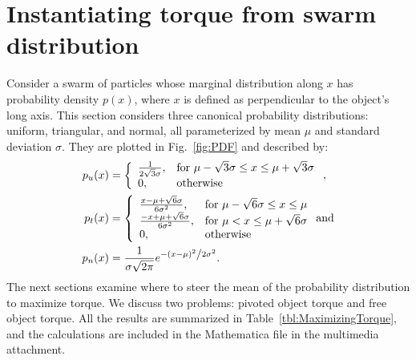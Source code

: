 \section{Instantiating torque from swarm distribution}\label{sec:torqueDist}
%
Consider a swarm of particles whose marginal distribution along $x$ has probability density $p(x)$, where $x$ is defined as perpendicular to the object's long axis.
This section considers three canonical probability distributions: uniform, triangular, and normal, all parameterized by mean $\mu$ and standard deviation $\sigma$. 
They are plotted in Fig.~\ref{fig:PDF} and described by:
%
\begin{align}
p_u(x) &=  \left\{
\begin{array}{ll}
    \frac{1}{2\sqrt{3}\sigma}, &  \textrm{for   } \mu-\sqrt{3}\sigma \leq x \leq \mu+\sqrt{3}\sigma\\
     0, & \textrm{otherwise}\\
\end{array} 
\right. ,\\
p_t(x) &=  \left\{
\begin{array}{ll}
    \frac{x-\mu + \sqrt{6} \sigma}{6\sigma^2}, &  \textrm{for   } \mu-\sqrt{6}\sigma \leq x \leq \mu\\
     \frac{-x+\mu + \sqrt{6} \sigma}{6\sigma^2}, &  \textrm{for   } \mu < x \leq \mu+ \sqrt{6}\sigma \\ 
     0, & \textrm{otherwise}\\
\end{array} 
\right.  \textrm{and} \\
p_n(x) &= \frac{1}{{\sigma \sqrt {2\pi } }}e^{{{ - \left( {x - \mu } \right)^2 } \mathord{\left/ {\vphantom {{ - \left( {x - \mu } \right)^2 } {2\sigma ^2 }}} \right. \kern-\nulldelimiterspace} {2\sigma ^2 }}}.
\end{align}
The next sections examine where to steer the mean of the probability distribution to maximize torque. We discuss two problems: pivoted object torque and free object torque. All the results are summarized in Table~\ref{tbl:MaximizingTorque}, and the calculations are included in the Mathematica file in the multimedia attachment.
%








